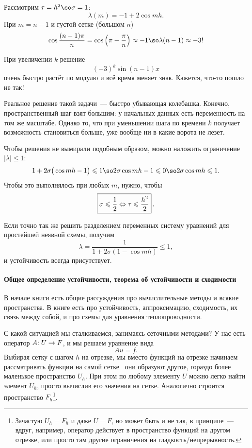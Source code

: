 \documentclass{trlnotes}
\begin{document}
Рассмотрим $\tau = h^2 \so \sigma = 1$:
\[
	\lambda(m) = -1 + 2 \cos mh.
\]
При $m = n - 1$ и густой сетке (большом $n$)
\[
	\cos \dfrac{(n - 1)\pi}{n} = \cos \left(\pi - \dfrac{\pi}{n}\right) \approx -1 \so \lambda(n - 1) \approx -3!
\]

При увеличении $k$ решение
\[
	(-3)^k \sin(n - 1)x
\]
очень быстро растёт по модулю и всё время меняет знак. Кажется, что-то пошло не так!

\begin{rem}
	Реальное решение такой задачи~--- быстро убывающая колебашка. Конечно, пространственный шаг взят большим: у начальных данных есть переменность на том же масштабе. Однако то, что при уменьшении шага по времени $k$ получает возможность становиться больше, уже вообще ни в какие ворота не лезет.
\end{rem}


Чтобы решения не вымирали подобным образом, можно наложить ограничение $|\lambda| \leqslant 1$:
\[
	1 + 2\sigma \big(\cos mh - 1\big) \leqslant 1 \so 2\sigma \cos mh - 1 \leqslant 0 \so 2 \sigma \cos mh \leqslant 1.
\]
Чтобы это выполнялось при любых $m$, нужно, чтобы
\[
	\boxed{\sigma \leqslant \dfrac{1}{2} \Leftrightarrow \tau \leqslant \dfrac{h^2}{2}} \, .
\]

Если точно так же решить разделением переменных систему уравнений для простейшей неявной схемы, получим
\[
	\lambda = \dfrac{1}{1 + 2\sigma(1 - \cos mh)} \leqslant 1,
\]
и устойчивость всегда присутствует.

\paragraph{Общее определение устойчивости, теорема об устойчивости и сходимости}

В начале книги \cite{gavurin} есть общие рассуждения про вычислительные методы и всякие пространства. В книге \cite{comp-krilov-2} есть про устойчивость, аппроксимацию, сходимость, их связь между собой, и про схемы для уравнения теплопроводности.

С какой ситуацией мы сталкиваемся, занимаясь сеточными методами? У нас есть оператор $A\text{\text{:}} \; U \to F$, и мы решаем уравнение вида
\[
	Au = f.
\]
Выбирая сетку с шагом $h$ на отрезке, мы вместо функций на отрезке начинаем рассматривать функции на самой сетке~ они образуют другое, гораздо более маленькое пространство $U_h$. При этом по любому элементу $U$ можно легко найти элемент $U_h$, просто вычислив его значения на сетке. Аналогично строится пространство $F_h$\footnote{Зачастую $U_h = F_h$ и даже $U = F$, но может быть и не так, в принципе~--- вдруг, например, оператор действует в пространство функций на другом отрезке, или просто там другие ограничения на гладкость/непрерывность.}.
\end{document}
